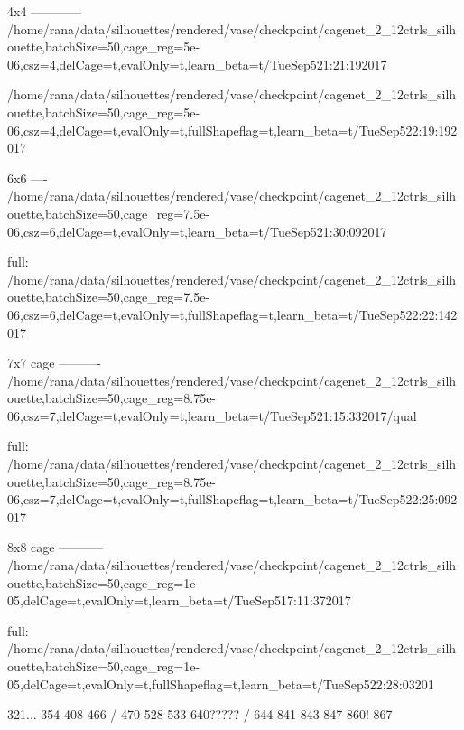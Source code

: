 \documentclass[acmtog,timestamp]{acmart}%
\begin{document}
4x4
------------
/home/rana/data/silhouettes/rendered/vase/checkpoint/cagenet_2_12ctrls_silhouette,batchSize=50,cage_reg=5e-06,csz=4,delCage=t,evalOnly=t,learn_beta=t/TueSep521:21:192017

/home/rana/data/silhouettes/rendered/vase/checkpoint/cagenet_2_12ctrls_silhouette,batchSize=50,cage_reg=5e-06,csz=4,delCage=t,evalOnly=t,fullShapeflag=t,learn_beta=t/TueSep522:19:192017

6x6
----
/home/rana/data/silhouettes/rendered/vase/checkpoint/cagenet_2_12ctrls_silhouette,batchSize=50,cage_reg=7.5e-06,csz=6,delCage=t,evalOnly=t,learn_beta=t/TueSep521:30:092017

full:
/home/rana/data/silhouettes/rendered/vase/checkpoint/cagenet_2_12ctrls_silhouette,batchSize=50,cage_reg=7.5e-06,csz=6,delCage=t,evalOnly=t,fullShapeflag=t,learn_beta=t/TueSep522:22:142017

7x7 cage
----------
/home/rana/data/silhouettes/rendered/vase/checkpoint/cagenet_2_12ctrls_silhouette,batchSize=50,cage_reg=8.75e-06,csz=7,delCage=t,evalOnly=t,learn_beta=t/TueSep521:15:332017/qual

full:
/home/rana/data/silhouettes/rendered/vase/checkpoint/cagenet_2_12ctrls_silhouette,batchSize=50,cage_reg=8.75e-06,csz=7,delCage=t,evalOnly=t,fullShapeflag=t,learn_beta=t/TueSep522:25:092017

8x8 cage
-----------
/home/rana/data/silhouettes/rendered/vase/checkpoint/cagenet_2_12ctrls_silhouette,batchSize=50,cage_reg=1e-05,delCage=t,evalOnly=t,learn_beta=t/TueSep517:11:372017

full:
/home/rana/data/silhouettes/rendered/vase/checkpoint/cagenet_2_12ctrls_silhouette,batchSize=50,cage_reg=1e-05,delCage=t,evalOnly=t,fullShapeflag=t,learn_beta=t/TueSep522:28:03201


321...
354
408
466 / 470
528
533
640????? / 644
841
843
847
860!
867
\end{document}
